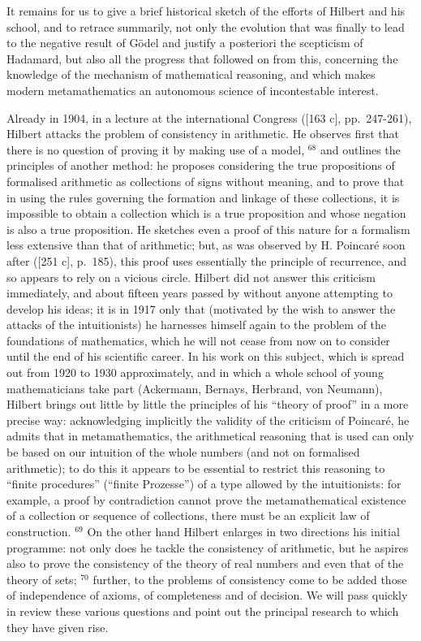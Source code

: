 It remains for us to give a brief historical sketch of the efforts of Hilbert and his school, and to retrace summarily, not only the evolution that was finally to lead to the negative result of Gödel and justify a posteriori the scepticism of Hadamard, but also all the progress that followed on from this, concerning the knowledge of the mechanism of mathematical reasoning, and which makes modern metamathematics an autonomous science of incontestable interest.

Already in 1904, in a lecture at the international Congress ({[}163 c{]}, pp.~247-261), Hilbert attacks the problem of consistency in arithmetic. He observes first that there is no question of proving it by making use of a model, \(^{68}\) and outlines the principles of another method: he proposes considering the true propositions of formalised arithmetic as collections of signs without meaning, and to prove that in using the rules governing the formation and linkage of these collections, it is impossible to obtain a collection which is a true proposition and whose negation is also a true proposition. He sketches even a proof of this nature for a formalism less extensive than that of arithmetic; but, as was observed by H. Poincaré soon after ({[}251 c{]}, p.~185), this proof uses essentially the principle of recurrence, and so appears to rely on a vicious circle. Hilbert did not answer this criticism immediately, and about fifteen years passed by without anyone attempting to develop his ideas; it is in 1917 only that (motivated by the wish to answer the attacks of the intuitionists) he harnesses himself again to the problem of the foundations of mathematics, which he will not cease from now on to consider until the end of his scientific career. In his work on this subject, which is spread out from 1920 to 1930 approximately, and in which a whole school of young mathematicians take part (Ackermann, Bernays, Herbrand, von Neumann), Hilbert brings out little by little the principles of his ``theory of proof'' in a more precise way: acknowledging implicitly the validity of the criticism of Poincaré, he admits that in metamathematics, the arithmetical reasoning that is used can only be based on our intuition of the whole numbers (and not on formalised arithmetic); to do this it appears to be essential to restrict this reasoning to ``finite procedures'' (``finite Prozesse'') of a type allowed by the intuitionists: for example, a proof by contradiction cannot prove the metamathematical existence of a collection or sequence of collections, there must be an explicit law of construction. \(^{69}\) On the other hand Hilbert enlarges in two directions his initial programme: not only does he tackle the consistency of arithmetic, but he aspires also to prove the consistency of the theory of real numbers and even that of the theory of sets; \(^{70}\) further, to the problems of consistency come to be added those of independence of axioms, of completeness and of decision. We will pass quickly in review these various questions and point out the principal research to which they have given rise.


